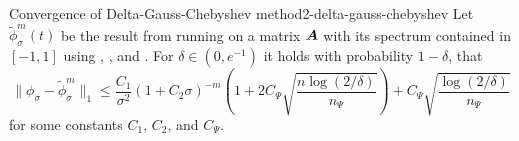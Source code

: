 \begin{theorem}{Convergence of Delta-Gauss-Chebyshev method}{2-delta-gauss-chebyshev}
    Let $\widetilde{\phi}_{\sigma}^m(t)$ be the result from running 
    on a matrix $\boldsymbol{A}$ with its spectrum contained in $[-1, 1]$ using
    , , and
    . For $\delta \in (0, e^{-1})$ it holds with
    probability $1-\delta$, that
    \begin{equation}
        \lVert \phi_{\sigma} - \widetilde{\phi}_{\sigma}^m\rVert _1
        \leq \frac{C_1}{\sigma^2} (1 + C_2 \sigma)^{-m} \left( 1 + 2 C_{\Psi} \sqrt{\frac{n \log(2/\delta)}{n_{\Psi}}} \right) + C_{\Psi} \sqrt{\frac{\log(2/\delta)}{n_{\Psi}}}
    \end{equation}
    for some constants $C_1$, $C_2$, and $C_{\Psi}$.
\end{theorem}

